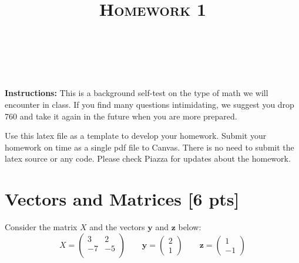 \documentclass[a4paper]{article}
\title{\textsc{Homework 1}} %
\author{
	\red{Name: Lucas Poon} \\
	\red{ID: llpoon}\\
}
\date{}
\theoremstyle{definition}
\begin{document}
	
	\maketitle 
	
	
	\textbf{Instructions:} 
	This is a background self-test on the type of math we will encounter in class. If you find many questions intimidating, we suggest you drop 760 and take it again in the future when you are more prepared.
	
	Use this latex file as a template to develop your homework.
	Submit your homework on time as a single pdf file to Canvas.
	There is no need to submit the latex source or any code.
	Please check Piazza for updates about the homework.
	
	
	\section{Vectors and Matrices [6 pts]}
	Consider the matrix $X$ and the vectors $\mathbf{y}$ and $\textbf{z}$ below:
	$$
	X = \begin{pmatrix}
		3 & 2 \\ -7 & -5 \\
	\end{pmatrix}
	\qquad \mathbf{y} = \begin{pmatrix}
		2 \\ 1
	\end{pmatrix} \qquad \mathbf{z} = \begin{pmatrix}
		1 \\ -1
	\end{pmatrix}
	$$
\end{document}

